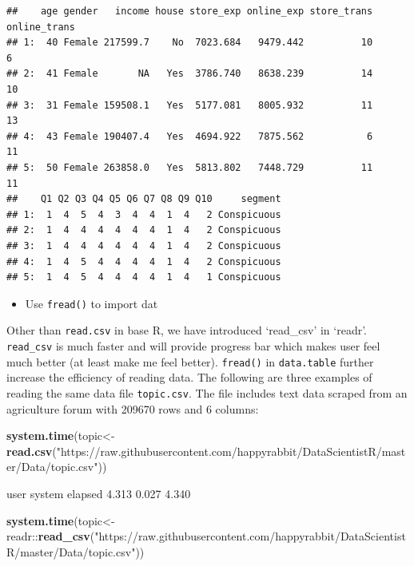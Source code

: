 \documentclass[]{book}
\newenvironment{Shaded}{\begin{snugshade}}{\end{snugshade}}
\newcommand{\KeywordTok}[1]{\textcolor[rgb]{0.13,0.29,0.53}{\textbf{{#1}}}}
\newcommand{\StringTok}[1]{\textcolor[rgb]{0.31,0.60,0.02}{{#1}}}
\newcommand{\NormalTok}[1]{{#1}}
\providecommand{\tightlist}{%
  \setlength{\itemsep}{0pt}\setlength{\parskip}{0pt}}
\theoremstyle{definition}
\theoremstyle{definition}
\theoremstyle{remark}
\begin{document}
\begin{verbatim}
##    age gender   income house store_exp online_exp store_trans online_trans
## 1:  40 Female 217599.7    No  7023.684   9479.442          10            6
## 2:  41 Female       NA   Yes  3786.740   8638.239          14           10
## 3:  31 Female 159508.1   Yes  5177.081   8005.932          11           13
## 4:  43 Female 190407.4   Yes  4694.922   7875.562           6           11
## 5:  50 Female 263858.0   Yes  5813.802   7448.729          11           11
##    Q1 Q2 Q3 Q4 Q5 Q6 Q7 Q8 Q9 Q10     segment
## 1:  1  4  5  4  3  4  4  1  4   2 Conspicuous
## 2:  1  4  4  4  4  4  4  1  4   2 Conspicuous
## 3:  1  4  4  4  4  4  4  1  4   2 Conspicuous
## 4:  1  4  5  4  4  4  4  1  4   2 Conspicuous
## 5:  1  4  5  4  4  4  4  1  4   1 Conspicuous
\end{verbatim}

\begin{itemize}
\tightlist
\item
  Use \texttt{fread()} to import dat
\end{itemize}

Other than \texttt{read.csv} in base R, we have introduced `read\_csv'
in `readr'. \texttt{read\_csv} is much faster and will provide progress
bar which makes user feel much better (at least make me feel better).
\texttt{fread()} in \texttt{data.table} further increase the efficiency
of reading data. The following are three examples of reading the same
data file \texttt{topic.csv}. The file includes text data scraped from
an agriculture forum with 209670 rows and 6 columns:

\begin{Shaded}
\begin{Highlighting}[]
\KeywordTok{system.time}\NormalTok{(topic<-}\KeywordTok{read.csv}\NormalTok{(}\StringTok{"https://raw.githubusercontent.com/happyrabbit/DataScientistR/master/Data/topic.csv"}\NormalTok{))}
\end{Highlighting}
\end{Shaded}

\begin{Shaded}
\begin{Highlighting}[]
  \NormalTok{user  system elapsed }
  \NormalTok{4.313   0.027   4.340}
\end{Highlighting}
\end{Shaded}

\begin{Shaded}
\begin{Highlighting}[]
\KeywordTok{system.time}\NormalTok{(topic<-readr::}\KeywordTok{read_csv}\NormalTok{(}\StringTok{"https://raw.githubusercontent.com/happyrabbit/DataScientistR/master/Data/topic.csv"}\NormalTok{))}
\end{Highlighting}
\end{Shaded}
\end{document}
